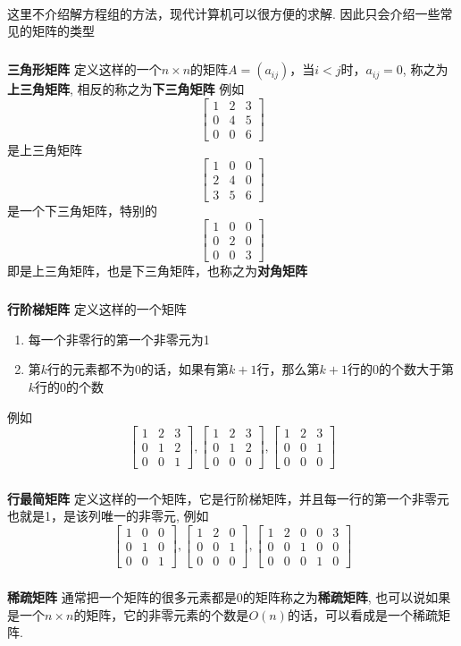 \paragraph{}
这里不介绍解方程组的方法，现代计算机可以很方便的求解. 因此只会介绍一些常见的矩阵的类型
\subparagraph{}
\textbf{三角形矩阵} \: 定义这样的一个$n\times n$的矩阵$A = (a_{ij})$，当$i < j$时，$a_{ij} = 0$, 称之为\textbf{上三角矩阵}, 相反的称之为\textbf{下三角矩阵}
例如
$$
\begin{bmatrix}
1 & 2 & 3 \\
0 & 4 & 5 \\
0 & 0 & 6 
\end{bmatrix}
$$是上三角矩阵
$$
\begin{bmatrix}
1 & 0 & 0 \\
2 & 4 & 0 \\
3 & 5 & 6 
\end{bmatrix}
$$是一个下三角矩阵，特别的
$$
\begin{bmatrix}
1 & 0 & 0 \\
0 & 2 & 0 \\
0 & 0 & 3 
\end{bmatrix}
$$即是上三角矩阵，也是下三角矩阵，也称之为\textbf{对角矩阵}
\subparagraph{}
\textbf{行阶梯矩阵} \: 定义这样的一个矩阵
\begin{enumerate}
\item 每一个非零行的第一个非零元为1
\item 第$k$行的元素都不为0的话，如果有第$k+1$行，那么第$k + 1$行的0的个数大于第$k$行的0的个数
\end{enumerate}
例如
$$
\begin{bmatrix}
1 & 2 & 3 \\
0 & 1 & 2 \\
0 & 0 & 1 
\end{bmatrix}, 
\begin{bmatrix}
1 & 2 & 3 \\
0 & 1 & 2 \\
0 & 0 & 0
\end{bmatrix}, 
\begin{bmatrix}
1 & 2 & 3 \\
0 & 0 & 1 \\
0 & 0 & 0
\end{bmatrix}
$$
\subparagraph{}
\textbf{行最简矩阵} \: 定义这样的一个矩阵，它是行阶梯矩阵，并且每一行的第一个非零元也就是1，是该列唯一的非零元, 例如
$$
\begin{bmatrix}
1 & 0 & 0 \\
0 & 1 & 0 \\
0 & 0 & 1
\end{bmatrix},
\begin{bmatrix}
1 & 2 & 0 \\
0 & 0 & 1 \\
0 & 0 & 0
\end{bmatrix}, 
\begin{bmatrix}
1 & 2 & 0 & 0 & 3 \\
0 & 0 & 1 & 0 & 0\\
0 & 0 & 0 & 1 & 0
\end{bmatrix}
$$
\subparagraph{}
\textbf{稀疏矩阵} \: 通常把一个矩阵的很多元素都是0的矩阵称之为\textbf{稀疏矩阵}, 也可以说如果是一个$n\times n$的矩阵，它的非零元素的个数是$O(n)$的话，可以看成是一个稀疏矩阵.


